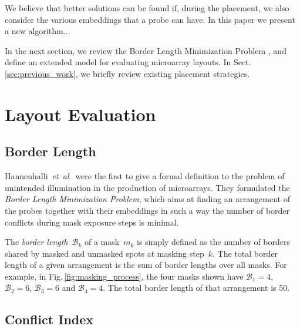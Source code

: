 \documentclass{llncs}
\begin{document}
We believe that better solutions can be found if, during the placement, we also
consider the various embeddings that a probe can have. In this paper we present
a new algorithm... %

In the next section, we review the Border Length Minimization Problem
\cite{HANNENHALLI02}, and define an extended model for evaluating microarray
layouts. In Sect.\,\ref{sec:previous_work}, we briefly review existing
placement strategies. %


\section{Layout Evaluation}
\label{sec:eval}

\subsection{Border Length}

Hannenhalli~{\it et~al}.\ were the first to give a formal definition to the problem
of unintended illumination in the production of microarrays. They formulated the
\emph{Border Length Minimization Problem}\cite{HANNENHALLI02}, which aims at finding
an arrangement of the probes together with their embeddings in such a way the number
of border conflicts during mask exposure steps is minimal.

The \emph{border length}~$\mathcal{B}_k$ of a mask~$m_{k}$ is simply
defined as the number of borders shared by masked and unmasked spots
at masking step~$k$. The total border length of a given arrangement is
the sum of border lengths over all masks. For example, in
Fig.\,\ref{fig:masking_process}, the four masks shown have
$\mathcal{B}_1 = 4$, $\mathcal{B}_2 = 6$, $\mathcal{B}_3 = 6$ and $\mathcal{B}_4 = 4$.
The total border length of that arrangement is 50.

\subsection{Conflict Index}
\end{document}
